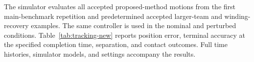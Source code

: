 The simulator evaluates all accepted proposed-method motions from the first main-benchmark repetition and predetermined accepted larger-team and winding-recovery examples. The same controller is used in the nominal and perturbed conditions. Table~\ref{tab:tracking-new} reports position error, terminal accuracy at the specified completion time, separation, and contact outcomes. Full time histories, simulator models, and settings accompany the results.
